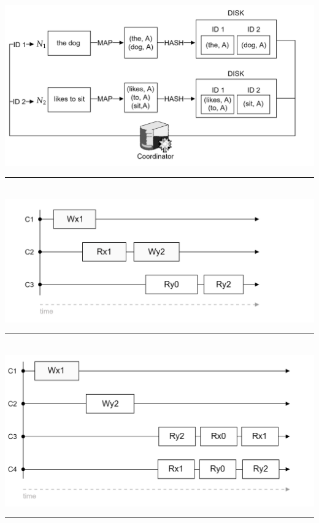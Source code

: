 \begin{multicols}{2}
\hspace{-1.5em}
\includegraphics[width=\linewidth]{Sections/mapreduce/nwork.png}\\
\noindent
\rule{\linewidth}{0.4pt}\\

\hspace{-1.5em}
\includegraphics[width=\linewidth]{Sections/consist/test.png}\\
\noindent
\rule{\linewidth}{0.4pt}\\

\hspace{-1.5em}
\includegraphics[width=\linewidth]{Sections/consist/event.png}\\
\noindent
\rule{\linewidth}{0.4pt}\\


\end{multicols}
